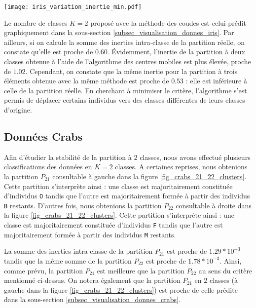\documentclass{article}
\begin{document}
\begin{multicols}{2}
\begingroup
   \centering
   \texttt{[image: iris\_variation\_inertie\_min.pdf]}
    \label{fig_mutations_test_2_pourc_iner}
\endgroup

Le nombre de classes $K = 2$ proposé avec la méthode des coudes est celui prédit graphiquement dans la sous-section \ref{subsec_visualisation_donnes_iris}. Par ailleurs, si on calcule la somme des inerties intra-classe de la partition réelle, on constate qu'elle est proche de $0.60$. Évidemment, l'inertie de la partition à deux classes obtenue à l'aide de l'algorithme des centres mobiles est plus élevée, proche de $1.02$. Cependant, on constate que la même inertie pour la partition à trois éléments obtenue avec la même méthode est proche de $0.53$ : elle est inférieure à celle de la partition réelle. En cherchant à minimiser le critère, l'algorithme s'est permis de déplacer certains individus vers des classes différentes de leurs classes d'origine.


\subsection{Données Crabs}
\label{subsec_methode_centres_mobiles_crabs}
Afin d'étudier la stabilité de la partition à $2$ classes, nous avons effectué plusieurs classifications des données en $K = 2$ classes. A certaines reprises, nous obtenions la partition $P_{21}$ consultable à gauche dans la figure \ref{fig_crabs_21_22_clusters}. Cette partition s'interprète ainsi : une classe est majoritairement constituée d'individus \texttt{O}  tandis que l'autre est majoritairement formée à partir des individus \texttt{B} restants. D'autres fois, nous obtenions la partition $P_{22}$ consultable à droite dans la figure \ref{fig_crabs_21_22_clusters}. Cette partition s'interprète ainsi : une classe est majoritairement constituée d'individus \texttt{F} tandis que l'autre est majoritairement formée à partir des individus \texttt{M} restants.

La somme des inerties intra-classe de la partition $P_{21}$ est proche de $1.29 * 10^{-3}$ tandis que la même somme de la partition $P_{22}$ est proche de $1.78 * 10^{-3}$. Ainsi, comme prévu, la partition $P_{21}$ est meilleure que la partition $P_{22}$ au sens du critère mentionné ci-dessus. On notera également que la partition $P_{21}$ en $2$ classes (à gauche dans la figure \ref{fig_crabs_21_22_clusters}) est proche de celle prédite dans la sous-section \ref{subsec_visualisation_donnes_crabs}.


\end{multicols}
\end{document}
